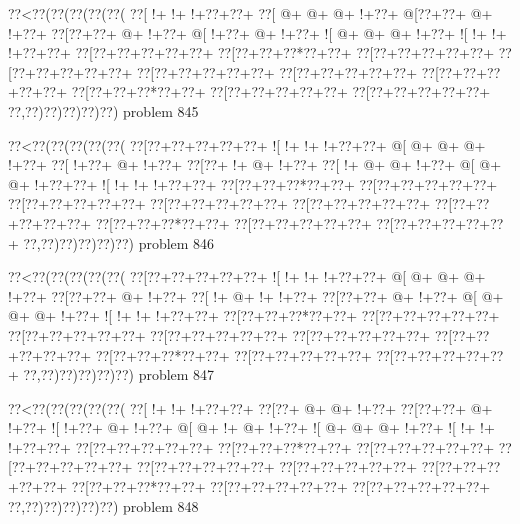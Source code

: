 \vbox{\vbox{\goo
\0??<\0??(\0??(\0??(\0??(\0??(
\0??[\- !+\- !+\- !+\0??+\0??+
\0??[\- @+\- @+\- @+\- !+\0??+
\- @[\0??+\0??+\- @+\- !+\0??+
\0??[\0??+\0??+\- @+\- !+\0??+
\- @[\- !+\0??+\- @+\- !+\0??+
\- ![\- @+\- @+\- @+\- !+\0??+
\- ![\- !+\- !+\- !+\0??+\0??+
\0??[\0??+\0??+\0??+\0??+\0??+
\0??[\0??+\0??+\0??*\0??+\0??+
\0??[\0??+\0??+\0??+\0??+\0??+
\0??[\0??+\0??+\0??+\0??+\0??+
\0??[\0??+\0??+\0??+\0??+\0??+
\0??[\0??+\0??+\0??+\0??+\0??+
\0??[\0??+\0??+\0??+\0??+\0??+
\0??[\0??+\0??+\0??*\0??+\0??+
\0??[\0??+\0??+\0??+\0??+\0??+
\0??[\0??+\0??+\0??+\0??+\0??+
\0??,\0??)\0??)\0??)\0??)\0??)
}
\hfil problem 845\hfil\break
}

\vbox{\vbox{\goo
\0??<\0??(\0??(\0??(\0??(\0??(
\0??[\0??+\0??+\0??+\0??+\0??+
\- ![\- !+\- !+\- !+\0??+\0??+
\- @[\- @+\- @+\- @+\- !+\0??+
\0??[\- !+\0??+\- @+\- !+\0??+
\0??[\0??+\- !+\- @+\- !+\0??+
\0??[\- !+\- @+\- @+\- !+\0??+
\- @[\- @+\- @+\- !+\0??+\0??+
\- ![\- !+\- !+\- !+\0??+\0??+
\0??[\0??+\0??+\0??*\0??+\0??+
\0??[\0??+\0??+\0??+\0??+\0??+
\0??[\0??+\0??+\0??+\0??+\0??+
\0??[\0??+\0??+\0??+\0??+\0??+
\0??[\0??+\0??+\0??+\0??+\0??+
\0??[\0??+\0??+\0??+\0??+\0??+
\0??[\0??+\0??+\0??*\0??+\0??+
\0??[\0??+\0??+\0??+\0??+\0??+
\0??[\0??+\0??+\0??+\0??+\0??+
\0??,\0??)\0??)\0??)\0??)\0??)
}
\hfil problem 846\hfil\break
}

\vbox{\vbox{\goo
\0??<\0??(\0??(\0??(\0??(\0??(
\0??[\0??+\0??+\0??+\0??+\0??+
\- ![\- !+\- !+\- !+\0??+\0??+
\- @[\- @+\- @+\- @+\- !+\0??+
\0??[\0??+\0??+\- @+\- !+\0??+
\0??[\- !+\- @+\- !+\- !+\0??+
\0??[\0??+\0??+\- @+\- !+\0??+
\- @[\- @+\- @+\- @+\- !+\0??+
\- ![\- !+\- !+\- !+\0??+\0??+
\0??[\0??+\0??+\0??*\0??+\0??+
\0??[\0??+\0??+\0??+\0??+\0??+
\0??[\0??+\0??+\0??+\0??+\0??+
\0??[\0??+\0??+\0??+\0??+\0??+
\0??[\0??+\0??+\0??+\0??+\0??+
\0??[\0??+\0??+\0??+\0??+\0??+
\0??[\0??+\0??+\0??*\0??+\0??+
\0??[\0??+\0??+\0??+\0??+\0??+
\0??[\0??+\0??+\0??+\0??+\0??+
\0??,\0??)\0??)\0??)\0??)\0??)
}
\hfil problem 847\hfil\break
}

\vbox{\vbox{\goo
\0??<\0??(\0??(\0??(\0??(\0??(
\0??[\- !+\- !+\- !+\0??+\0??+
\0??[\0??+\- @+\- @+\- !+\0??+
\0??[\0??+\0??+\- @+\- !+\0??+
\- ![\- !+\0??+\- @+\- !+\0??+
\- @[\- @+\- !+\- @+\- !+\0??+
\- ![\- @+\- @+\- @+\- !+\0??+
\- ![\- !+\- !+\- !+\0??+\0??+
\0??[\0??+\0??+\0??+\0??+\0??+
\0??[\0??+\0??+\0??*\0??+\0??+
\0??[\0??+\0??+\0??+\0??+\0??+
\0??[\0??+\0??+\0??+\0??+\0??+
\0??[\0??+\0??+\0??+\0??+\0??+
\0??[\0??+\0??+\0??+\0??+\0??+
\0??[\0??+\0??+\0??+\0??+\0??+
\0??[\0??+\0??+\0??*\0??+\0??+
\0??[\0??+\0??+\0??+\0??+\0??+
\0??[\0??+\0??+\0??+\0??+\0??+
\0??,\0??)\0??)\0??)\0??)\0??)
}
\hfil problem 848\hfil\break
}

